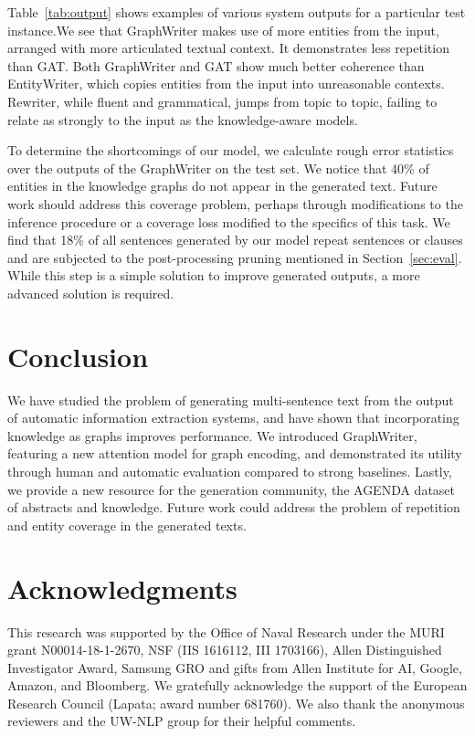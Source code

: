 \documentclass[11pt,a4paper]{article}
\begin{document}
Table~\ref{tab:output} shows examples of various system outputs for a particular test instance.We see that GraphWriter makes use of more entities from the input, arranged with more articulated textual context. 
It demonstrates less repetition than GAT. 
Both GraphWriter and GAT show much better coherence than EntityWriter, which copies entities from the input into unreasonable contexts. 
Rewriter, while fluent and grammatical, jumps from topic to topic, failing to relate as strongly to the input as the knowledge-aware models.



To determine the shortcomings of our model, we calculate rough error statistics over the outputs of the GraphWriter on the test set. We notice that 40\% of entities in the knowledge graphs do not appear in the generated text. 
Future work should address this coverage problem, perhaps through modifications to the inference procedure or a coverage loss \citep{tu2016modeling} modified to the specifics of this task. 
We find that 18\% of all sentences generated by our model repeat sentences or clauses and are subjected to the post-processing pruning mentioned in Section~\ref{sec:eval}.
While this step is a simple solution to improve generated outputs, a more advanced solution is required. 

\section{Conclusion}    
We have studied the problem of generating multi-sentence text from the output of automatic information extraction systems, and have shown that incorporating knowledge as graphs improves performance.
We introduced GraphWriter, featuring a new attention model for graph encoding, and demonstrated its utility through human and automatic evaluation compared to strong baselines.
Lastly, we provide a new resource for the generation community, the AGENDA dataset of abstracts and knowledge. 
Future work could address the problem of repetition and entity coverage in the generated texts. \
\section*{Acknowledgments}
This research was supported by the Office of Naval Research under the MURI grant N00014-18-1-2670, NSF (IIS 1616112, III 1703166), Allen Distinguished Investigator Award, Samsung GRO and gifts from Allen Institute for AI, Google, Amazon, and Bloomberg. We gratefully acknowledge the support of the European Research Council (Lapata; award number 681760). We also thank the anonymous reviewers and the UW-NLP group for their helpful comments.



\end{document}
